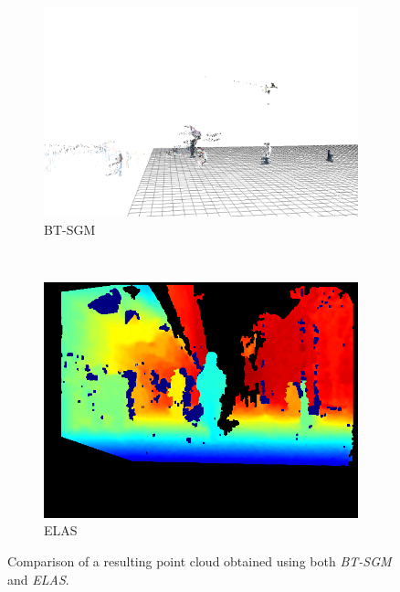 \begin{figure}[t]
        \centering
        \begin{subfigure}[b]{0.475\textwidth}
                \centering
                \includegraphics[width=\textwidth]{btsgm}
                \caption{BT-SGM}\label{fig:cp05_bt_sgm}
        \end{subfigure}%
        ~ 
        \begin{subfigure}[b]{0.475\textwidth}
                \centering
                \includegraphics[width=\textwidth]{elas}
                \caption{ELAS}\label{fig:cp05_elas}
        \end{subfigure}%
        \caption{Comparison of a resulting point cloud obtained using both \emph{BT-SGM} and \emph{ELAS}.}\label{fig:cp05_comparison_bt_sgm_vs_elas}
\end{figure}

